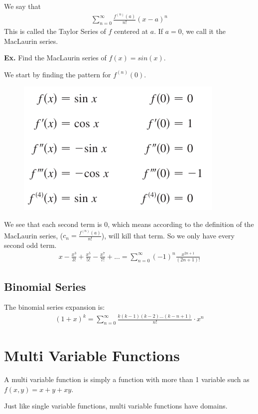 \documentclass[12pt,letterpaper]{article} \usepackage{amsmath} \usepackage{graphicx}  \usepackage{longtable}  \usepackage{amssymb}
\begin{document}
    We say that
    \begin{align*}
        \sum^{\infty}_{n=0} \frac{f^{(n)}(a)}{n!} (x-a)^n
    \end{align*}
    This is called the Taylor Series of $f$ centered at $a$. If $a=0$, we call it the MacLaurin series. 

    \begin{mdframed}
        \textbf{Ex. } Find the MacLaurin series of $f(x)=sin(x)$.
        
        We start by finding the pattern for $f^{(n)}(0)$. 
        \begin{figure}[H]
            \centering
            \includegraphics[width=0.4\linewidth]{sub.png}
        \end{figure}

        We see that each second term is 0, which means according to the definition of the MacLaurin series, ($c_n = \frac{f^{(n)}(a)}{n!}$), will kill that term. So we only have every second odd term.
        \begin{align*}
            x-\frac{x^3}{3!}+\frac{x^5}{5!}-\frac{x^7}{7!}+...=\sum^{\infty}_{n=0} (-1)^n \frac{x^{2n+1}}{(2n+1)!}
        \end{align*}
    \end{mdframed}

        \subsection{Binomial Series}
        The binomial series expansion is:
        \begin{align*}
            (1+x)^k = \sum^{\infty}_{n=0}\frac{k(k-1)(k-2)...(k-n+1)}{n!}\cdot x^n
        \end{align*}

    \section{Multi Variable Functions}
    A multi variable function is simply a function with more than 1 variable such as $f(x,y) = x+y + xy$.

    Just like single variable functions, multi variable functions have domains. 
\end{document}
